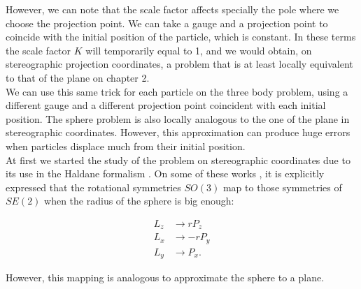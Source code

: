 However, we can note that the scale factor affects specially the pole where we choose the projection point. We can take a gauge and a projection point to coincide with the initial position of the particle, which is constant. In these terms the scale factor $K$ will temporarily equal to 1, and we would obtain, on stereographic projection coordinates, a problem that is at least locally equivalent to that of the plane on chapter 2.\\

We can use this same trick for each particle on the three body problem, using a different gauge and a different projection point coincident with each initial position. The sphere problem is also locally analogous to the one of the plane in stereographic coordinates. However, this approximation can produce huge errors when particles displace much from their initial position.\\

At first we started the study of the problem on stereographic coordinates due to its use in the Haldane formalism \cite{haldane}\cite{haldane2}\cite{haldane3}. On some of these works \cite{haldane2}\cite{haldane3}, it is explicitly expressed that the rotational symmetries $SO(3)$ map to those symmetries of $SE(2)$ when the radius of the sphere is big enough:

\begin{align*}
L_z &\to rP_z\\
L_x &\to -rP_y\\
L_y &\to P_x.
\end{align*}

However, this mapping is analogous to approximate the sphere to a plane.\\




































